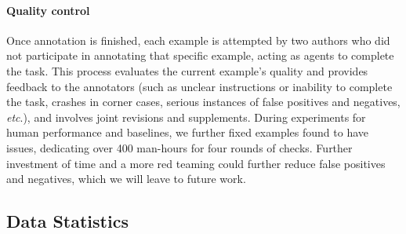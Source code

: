 \paragraph{Quality control}
Once annotation is finished, each example is attempted by two authors who did not participate in annotating that specific example, acting as agents to complete the task. 
This process evaluates the current example's quality and provides feedback to the annotators (such as unclear instructions or inability to complete the task, crashes in corner cases, serious instances of false positives and negatives, \textit{etc}.), and involves joint revisions and supplements. 
During experiments for human performance and baselines, we further fixed examples found to have issues, dedicating over 400 man-hours for four rounds of checks.
Further investment of time and a more red teaming could further reduce false positives and negatives, which we will leave to future work.

\subsection{Data Statistics}
\vspace{-5pt}

